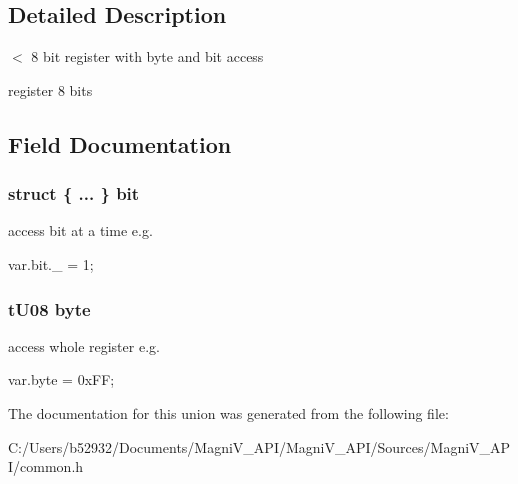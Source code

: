 \subsection{Detailed Description}
$<$ 8 bit register with byte and bit access 

register 8 bits 

\subsection{Field Documentation}
\hypertarget{unionu_r_e_g08_aa2f8474dc62c9ed43e927c04a4c9319d}{}
\subsubsection[{bit}]{\setlength{\rightskip}{0pt plus 5cm}struct \{ ... \}  bit}\label{unionu_r_e_g08_aa2f8474dc62c9ed43e927c04a4c9319d}


access bit at a time e.\+g. 

var.\+bit.\+\_ = 1; \hypertarget{unionu_r_e_g08_aba308d63db050aed25cfd36c37e41ad4}{}
\subsubsection[{byte}]{\setlength{\rightskip}{0pt plus 5cm}t\+U08 byte}\label{unionu_r_e_g08_aba308d63db050aed25cfd36c37e41ad4}


access whole register e.\+g. 

var.\+byte = 0x\+F\+F; 

The documentation for this union was generated from the following file\+:\begin{DoxyCompactItemize}
\item 
C\+:/\+Users/b52932/\+Documents/\+Magni\+V\+\_\+\+A\+P\+I/\+Magni\+V\+\_\+\+A\+P\+I/\+Sources/\+Magni\+V\+\_\+\+A\+P\+I/common.\+h\end{DoxyCompactItemize}
